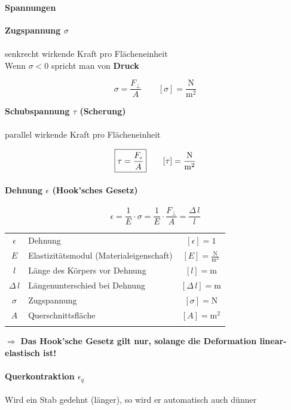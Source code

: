 		\paragraph{Spannungen}
		\textbf{Zugspannung $\sigma$} \\
		\\
		senkrecht wirkende Kraft pro Flächeneinheit \\
		Wenn $\sigma < 0$ spricht man von \textbf{Druck} 
		
		$$ \boxed{ \sigma = \frac{F_{\perp}}{A} } \qquad [\sigma] = \mathrm{\frac{N}{m^2}}$$ 
				
		

		\textbf{Schubspannung $\tau$ (Scherung)} \\
		\\
		parallel wirkende Kraft pro Flächeneinheit 
		
		$$ \boxed{ \tau = \frac{F_{\shortparallel}}{A} } \qquad [\tau] = \mathrm{\frac{N}{m^2}}$$

		
		

		\paragraph{Dehnung $\epsilon$ (Hook'sches Gesetz)}
		$$ \boxed{ \epsilon = \frac{1}{E} \cdot \sigma = \frac{1}{E} \cdot \frac{F_{\perp}}{A} = \frac{\Delta \, l}{l} } $$ 
		
		
		\begin{tabular}{c l c}
		$\epsilon$ & Dehnung & $[\epsilon] = 1$ \\
		$E$ & Elastizitätsmodul (Materialeigenschaft) & $[E] = \mathrm{\frac{N}{m^2}}$ \\
		$l$ & Länge des Körpers vor Dehnung & $[l] = \mathrm{m}$ \\
		$\Delta \, l$ & Längenunterschied bei Dehnung & $[\Delta \, l] = \mathrm{m}$ \\
		$\sigma$ & Zugspannung & $[\sigma] = \mathrm{N}$ \\
		$A$ & Querschnittsfläche & $[A] = \mathrm{m^2}$ \\
		\\
		\end{tabular}
		
		$\Rightarrow$ \textbf{Das Hook'sche Gesetz gilt nur, solange die Deformation linear-elastisch ist!}
		
		
		
		\paragraph{Querkontraktion $\epsilon_q$}
		Wird ein Stab gedehnt (länger), so wird er automatisch auch dünner \\		
		
